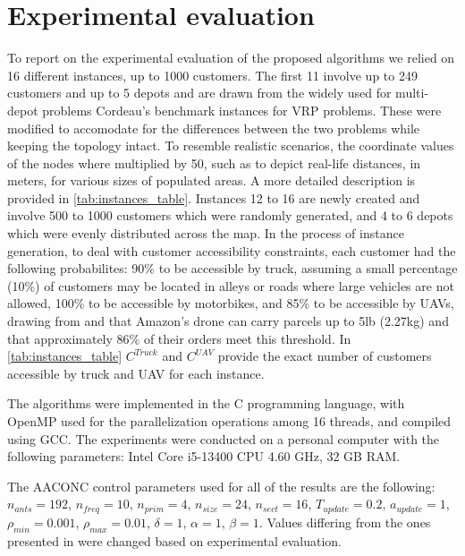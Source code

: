 \documentclass{article}
\begin{document}
	\section{Experimental evaluation}
	To report on the experimental evaluation of the proposed algorithms we relied on 16 different instances, up to 1000 customers. The first 11 involve up to 249 customers and up to 5 depots and are drawn from the widely used for multi-depot problems Cordeau's \cite{Cordeau1997} benchmark instances for VRP problems. These were modified to accomodate for the differences between the two problems while keeping the topology intact. To resemble realistic scenarios, the coordinate values of the nodes where multiplied by 50, such as to depict real-life distances, in meters, for various sizes of populated areas. A more detailed description is provided in \autoref{tab:instances_table}. Instances 12 to 16 are newly created and involve 500 to 1000 customers which were randomly generated, and 4 to 6 depots which were evenly distributed across the map. In the process of instance generation, to deal with customer accessibility constraints, each customer had the following probabilites: 90\% to be accessible by truck, assuming a small percentage (10\%) of customers may be located in alleys or roads where large vehicles are not allowed, 100\% to be accessible by motorbikes, and 85\% to be accessible by UAVs, drawing from \cite{Sacramento2019} and \cite{Allain2013} that Amazon's drone can carry parcels up to 5lb (2.27kg) and that approximately 86\% of their orders meet this threshold. In \autoref{tab:instances_table} $C^{Truck}$ and $C^{UAV}$  provide the exact number of customers accessible by truck and UAV for each instance.
	
	\par
	The algorithms were implemented in the C programming language, with OpenMP used for the parallelization operations among 16 threads, and compiled using GCC. The experiments were conducted on a personal computer with the following parameters: Intel Core i5-13400 CPU 4.60 GHz, 32 GB RAM.
	\par
	The AACONC control parameters used for all of the results are the following: $n_{ants} = 192$, $n_{freq} = 10$, $n_{prim} = 4$, $n_{size} = 24$, $n_{sect} = 16$, $T_{update} = 0.2$, $a_{update} = 1$, $\rho_{min} = 0.001$, $\rho_{max} = 0.01$, $\delta = 1$, $\alpha = 1$, $\beta = 1$. Values differing from the ones presented in \parencite{Stodola2022} were changed based on experimental evaluation.
\end{document}
